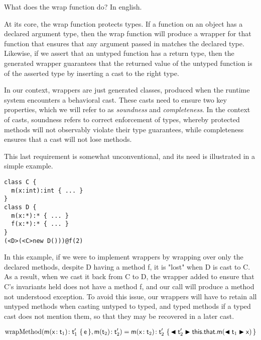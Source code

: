 \documentclass[a4paper,UKenglish,final]{lipics}
\begin{document}
What does the wrap function do? In english.

At its core, the wrap function protects types. If a function on an object has a declared argument type, then the wrap function will produce a wrapper for that function that ensures that any argument passed in matches the declared type. Likewise, if we assert that an untyped function has a return type, then the generated wrapper guarantees that the returned value of the untyped function is of the asserted type by inserting a cast to the right type.

In our context, wrappers are just generated classes, produced when the runtime system encounters a behavioral cast. These casts need to ensure two key properties, which we will refer to as \emph{soundness} and \emph{completeness}. In the context of casts, soundness refers to correct enforcement of types, whereby protected methods will not observably violate their type guarantees, while completeness ensures that a cast will not lose methods.

This last requirement is somewhat unconventional, and its need is illustrated in a simple example. 

\begin{verbatim}
class C {
  m(x:int):int { ... }
}
class D {
  m(x:*):* { ... }
  f(x:*):* { ... }
}
(<D>(<C>new D()))@f(2)
\end{verbatim}

In this example, if we were to implement wrappers by wrapping over only the declared methods, despite D having a method f, it is "lost" when D is cast to C. As a result, when we cast it back from C to D, the wrapper added to ensure that C's invariants held does not have a method f, and our call will produce a method not understood exception. To avoid this issue, our wrappers will have to retain all untyped methods when casting untyped to typed, and typed methods if a typed cast does not mention them, so that they may be recovered in a later cast.

\hrulefill
\newcommand{\wm}{\text{wrapMethod}}
\begin{align*}
\wm{(\Mdef\m\x{\t_1}{\tp_1}\e,\Mtype\m{\t_2}{\tp_2})} = \Mdef\m\x{\t_2}{\tp_2}{\BehCast{\tp_2}{\Call{\this.\xt{that}}{\m}{\BehCast{\t_1}{\x}}}}\\
\end{align*}
\end{document}
